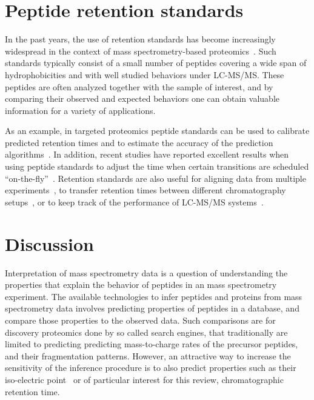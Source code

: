 \documentclass[a4paper]{article}
\begin{document}
\section{\label{sec:irt}Peptide retention standards}

In the past years, the use of retention standards has become
increasingly widespread in the context of mass spectrometry-based
proteomics~\cite{olegstd, irt}. Such standards typically consist of a
small number of peptides covering a wide span of hydrophobicities and
with well studied behaviors under LC-MS/MS. These peptides are often
analyzed together with the sample of interest, and by comparing their
observed and expected behaviors one can obtain valuable information
for a variety of applications.



As an example, in targeted proteomics peptide standards can be used to
 calibrate predicted retention times and to estimate the accuracy of
 the prediction algorithms~\cite{Kiyonami01022011}. In addition,
 recent studies have reported excellent results when using peptide
 standards to adjust the time when certain transitions are scheduled
 ``on-the-fly''~\cite{seb, irt}. Retention standards are also useful
 for aligning data from multiple experiments~\cite{petritis2003}, to
 transfer retention times between different chromatography
 setups~\cite{seb}, or to keep track of the performance of LC-MS/MS
 systems~\cite{qcal}.

\section{Discussion}

Interpretation of mass spectrometry data is a question of
understanding the properties that explain the behavior of peptides in
an mass spectrometry experiment. The available technologies to infer
peptides and proteins from mass spectrometry data involves predicting
properties of peptides in a database, and compare those properties to
the observed data. Such comparisons are for discovery proteomics done
by so called search engines, that traditionally are limited to
predicting predicting mass-to-charge rates of the precursor peptides,
and their fragmentation patterns. However, an attractive way to
increase the sensitivity of the inference procedure is to also predict
properties such as their iso-electric point~\cite{branca2014hirief} or
of particular interest for this review, chromatographic retention
time\cite{cerqueira2010mude}. 
\end{document}
